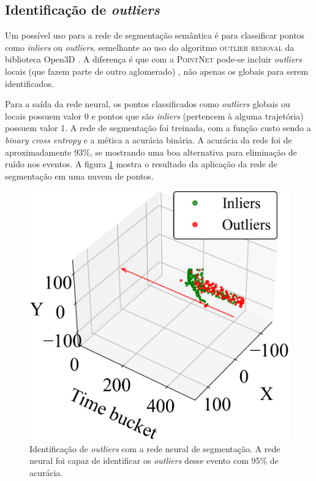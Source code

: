 \documentclass[a4paper,12pt,oneside]{book}
\begin{document}
\subsection{Identificação de \textit{outliers}}

\par Um possível uso para a rede de segmentação semântica é para classificar pontos como \textit{inliers} ou \textit{outliers}, semelhante ao uso do algoritmo \textsc{outlier removal} da biblioteca Open3D \cite{open3d}. A diferença é que com a \textsc{PointNet} pode-se incluir \textit{outliers} locais (que fazem parte de outro aglomerado) \cite{RF_pc}, não apenas os globais para serem identificados.

\par Para a saída da rede neural, os pontos classificados como \textit{outliers} globais ou locais possuem valor 0 e pontos que são \textit{inliers} (pertencem à alguma trajetória) possuem valor 1. A rede de segmentação foi treinada, com a função custo sendo a \textit{binary cross entropy} e a mética a acurácia binária. A acurácia da rede foi de aproximadamente 93\%, se mostrando uma boa alternativa para eliminação de ruído nos eventos. A figura \ref{fig:pointnet_segment_exs} mostra o resultado da aplicação da rede de segmentação em uma nuvem de pontos.

\begin{figure}[H]
    \centering
    \includegraphics[scale = 0.4]{figs/pointnet_seg_ex1.png}
    \caption{Identificação de \textit{outliers} com a rede neural de segmentação. A rede neural foi capaz de identificar os \textit{outliers} desse evento com 95\% de acurácia.}
    \label{fig:pointnet_segment_exs}
\end{figure}
\end{document}
